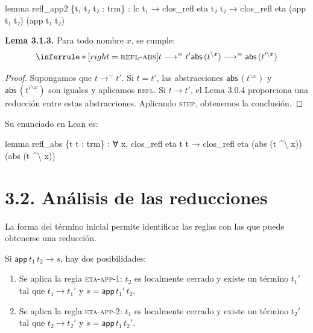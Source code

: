 \documentclass[
  spanish,
  letterpaper,
  DIV=11,
  numbers=noendperiod]{scrreprt}
\newenvironment{Shaded}{\begin{snugshade}}{\end{snugshade}}
\newcommand{\KeywordTok}[1]{\textcolor[rgb]{0.00,0.23,0.31}{\textbf{#1}}}
\newcommand{\NormalTok}[1]{\textcolor[rgb]{0.00,0.23,0.31}{#1}}
\renewcommand{\NormalTok}[1]{\textcolor[HTML]{000000}{#1}}
\renewcommand{\KeywordTok}[1]{\textcolor[HTML]{0000FF}{#1}}
\theoremstyle{remark}
\begin{document}
\begin{Shaded}
\begin{Highlighting}[]
\KeywordTok{lemma}\NormalTok{ refl\_app2 \{t₁ t₂ t₂\textquotesingle{} : trm\} :}
\NormalTok{    lc t₁ →}
\NormalTok{    clos\_refl eta t₂ t₂\textquotesingle{} →}
\NormalTok{    clos\_refl eta (app t₁ t₂) (app t₁ t₂\textquotesingle{}) }
\end{Highlighting}
\end{Shaded}

\textbf{Lema 3.1.3.} Para todo nombre \(x\), se cumple: \[
\inferrule*[right=\textsc{refl-abs}]
  {t \longrightarrow^{=} t'}
  {\mathsf{abs}\,(t^{\backslash x})
    \longrightarrow^{=}
    \mathsf{abs}\,(t'^{\backslash x})}
\]

\begin{proof}
Supongamos que \(t\longrightarrow^{=}t'\). Si \(t=t'\), las
abstracciones \(\mathsf{abs} \, (t^{\backslash x})\) y
\(\mathsf{abs} \, (t'^{\backslash x})\) son iguales y aplicamos
\textsc{refl}. Si \(t\longrightarrow t'\), el Lema 3.0.4 proporciona una
reducción entre estas abstracciones. Aplicando \textsc{step}, obtenemos
la conclusión.
\end{proof}

Su enunciado en Lean es:

\begin{Shaded}
\begin{Highlighting}[]
\KeywordTok{lemma}\NormalTok{ refl\_abs \{t t\textquotesingle{} : trm\} :}
\NormalTok{    ∀ x, clos\_refl eta t t\textquotesingle{} →}
\NormalTok{    clos\_refl eta (abs (t \^{}\textbackslash{} x)) (abs (t\textquotesingle{} \^{}\textbackslash{} x))}
\end{Highlighting}
\end{Shaded}

\section{3.2. Análisis de las
reducciones}\label{anuxe1lisis-de-las-reducciones}

La forma del término inicial permite identificar las reglas con las que
puede obtenerse una reducción.

Si \(\mathsf{app}\,t_1\,t_2\longrightarrow s\), hay dos posibilidades:

\begin{enumerate}
\def\labelenumi{\arabic{enumi}.}
\item
  Se aplica la regla \textsc{eta-app-1}: \(t_2\) es localmente cerrado y
  existe un término \(t_1'\) tal que \(t_1\longrightarrow t_1'\) y
  \(s=\mathsf{app}\,t_1'\,t_2\).
\item
  Se aplica la regla \textsc{eta-app-2}: \(t_1\) es localmente cerrado y
  existe un término \(t_2'\) tal que \(t_2\longrightarrow t_2'\) y
  \(s=\mathsf{app}\,t_1\,t_2'\).
\end{enumerate}
\end{document}
